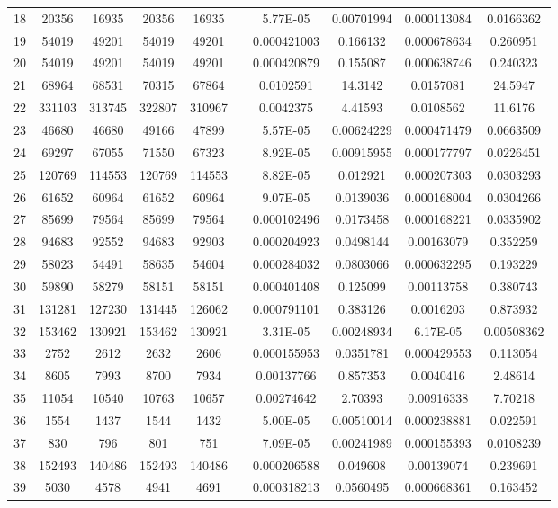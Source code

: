 \documentclass{article}
\begin{document}
\begin{table}[h!]
\begin{tabular}{c||c|c|c|c c c|c|c|c}
18 & 20356 & 16935 & 20356 & 16935 &  & 5.77E-05 & 0.00701994 & 0.000113084 & 0.0166362 \\
19 & 54019 & 49201 & 54019 & 49201 &  & 0.000421003 & 0.166132 & 0.000678634 & 0.260951 \\
20 & 54019 & 49201 & 54019 & 49201 &  & 0.000420879 & 0.155087 & 0.000638746 & 0.240323 \\
21 & 68964 & 68531 & 70315 & 67864 &  & 0.0102591 & 14.3142 & 0.0157081 & 24.5947 \\
22 & 331103 & 313745 & 322807 & 310967 &  & 0.0042375 & 4.41593 & 0.0108562 & 11.6176 \\
23 & 46680 & 46680 & 49166 & 47899 &  & 5.57E-05 & 0.00624229 & 0.000471479 & 0.0663509 \\
24 & 69297 & 67055 & 71550 & 67323 &  & 8.92E-05 & 0.00915955 & 0.000177797 & 0.0226451 \\
25 & 120769 & 114553 & 120769 & 114553 &  & 8.82E-05 & 0.012921 & 0.000207303 & 0.0303293 \\
26 & 61652 & 60964 & 61652 & 60964 &  & 9.07E-05 & 0.0139036 & 0.000168004 & 0.0304266 \\
27 & 85699 & 79564 & 85699 & 79564 &  & 0.000102496 & 0.0173458 & 0.000168221 & 0.0335902 \\
28 & 94683 & 92552 & 94683 & 92903 &  & 0.000204923 & 0.0498144 & 0.00163079 & 0.352259 \\
29 & 58023 & 54491 & 58635 & 54604 &  & 0.000284032 & 0.0803066 & 0.000632295 & 0.193229 \\
30 & 59890 & 58279 & 58151 & 58151 &  & 0.000401408 & 0.125099 & 0.00113758 & 0.380743 \\
31 & 131281 & 127230 & 131445 & 126062 &  & 0.000791101 & 0.383126 & 0.0016203 & 0.873932 \\
32 & 153462 & 130921 & 153462 & 130921 &  & 3.31E-05 & 0.00248934 & 6.17E-05 & 0.00508362 \\
33 & 2752 & 2612 & 2632 & 2606 &  & 0.000155953 & 0.0351781 & 0.000429553 & 0.113054 \\
34 & 8605 & 7993 & 8700 & 7934 &  & 0.00137766 & 0.857353 & 0.0040416 & 2.48614 \\
35 & 11054 & 10540 & 10763 & 10657 &  & 0.00274642 & 2.70393 & 0.00916338 & 7.70218 \\
36 & 1554 & 1437 & 1544 & 1432 &  & 5.00E-05 & 0.00510014 & 0.000238881 & 0.022591 \\
37 & 830 & 796 & 801 & 751 &  & 7.09E-05 & 0.00241989 & 0.000155393 & 0.0108239 \\
38 & 152493 & 140486 & 152493 & 140486 &  & 0.000206588 & 0.049608 & 0.00139074 & 0.239691 \\
39 & 5030 & 4578 & 4941 & 4691 &  & 0.000318213 & 0.0560495 & 0.000668361 & 0.163452 \\


\end{tabular}
\end{table}
\end{document}
